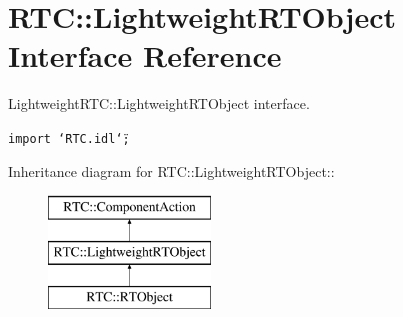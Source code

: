 \section{RTC::Lightweight\-RTObject Interface Reference}
\label{interfaceRTC_1_1LightweightRTObject}
Lightweight\-RTC::Lightweight\-RTObject interface.  


{\tt import \char`\"{}RTC.idl\char`\"{};}

Inheritance diagram for RTC::Lightweight\-RTObject::\begin{figure}[H]
\begin{center}
\leavevmode
\includegraphics[height=3cm]{interfaceRTC_1_1LightweightRTObject}
\end{center}
\end{figure}
